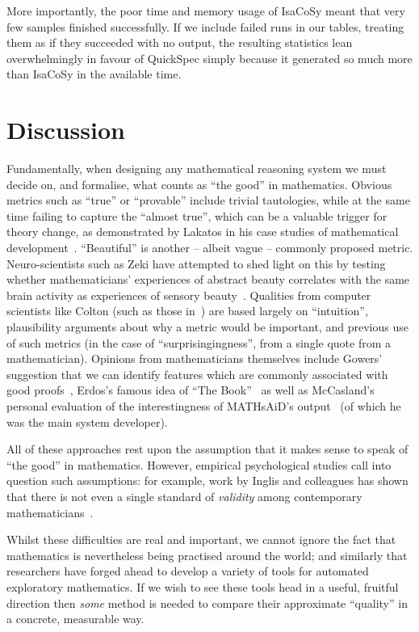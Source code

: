More importantly, the poor time and memory usage of IsaCoSy meant that very few
samples finished successfully. If we include failed runs in our tables, treating
them as if they succeeded with no output, the resulting statistics lean
overwhelmingly in favour of QuickSpec simply because it generated so much more
than IsaCoSy in the available time.

\section{Discussion}
\label{sec:discussion}

Fundamentally, when designing any mathematical reasoning system we must decide
on, and formalise, what counts as ``the good'' in mathematics.  Obvious metrics
such as ``true'' or ``provable'' include trivial tautologies, while at the same
time failing to capture the ``almost true'', which can be a valuable trigger for
theory change, as demonstrated by Lakatos in his case studies of mathematical
development~\cite{lakatos}. ``Beautiful'' is another -- albeit vague -- commonly
proposed metric. Neuro-scientists such as Zeki \etal{} have attempted to shed
light on this by testing whether mathematicians' experiences of abstract beauty
correlates with the same brain activity as experiences of sensory
beauty~\cite{10.3389/fnhum.2014.00068}. Qualities from computer scientists like
Colton (such as those in~\cite{colton2000notion}) are based largely on
``intuition'', plausibility arguments about why a metric would be important, and
previous use of such metrics (in the case of ``surprisingingness'', from a
single quote from a mathematician). Opinions from mathematicians themselves
include Gowers' suggestion that we can identify features which are commonly
associated with good proofs~\cite{gowers2000two}, Erdos's famous idea of ``The
Book''~\cite{aigner2010proofs} as well as McCasland's personal evaluation of the
interestingness of MATHsAiD's output~\cite{roy} (of which he was the main system
developer).

All of these approaches rest upon the assumption that it makes sense to speak of
``the good'' in mathematics. However, empirical psychological studies
call into question such assumptions: for example, work by Inglis and colleagues
has shown that there is not even a single standard of \emph{validity} among
contemporary mathematicians~\cite{inglis2013mathematicians}.

Whilst these difficulties are real and important, we cannot ignore the fact that
mathematics is nevertheless being practised around the world; and similarly that
researchers have forged ahead to develop a variety of tools for automated
exploratory mathematics. If we wish to see these tools head in a useful,
fruitful direction then \emph{some} method is needed to compare their
approximate ``quality'' in a concrete, measurable way.

